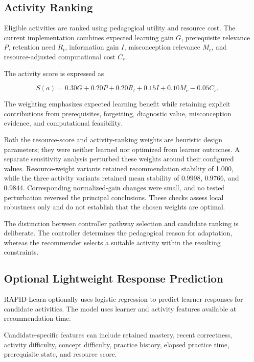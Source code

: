 \documentclass[conference]{IEEEtran}
\begin{document}
\subsection{Activity Ranking}

Eligible activities are ranked using pedagogical utility and resource cost. The current implementation combines expected learning gain $G$, prerequisite relevance $P$, retention need $R_t$, information gain $I$, misconception relevance $M_c$, and resource-adjusted computational cost $C_r$.

The activity score is expressed as

\begin{equation}
S(a)=0.30G+0.20P+0.20R_t+0.15I+0.10M_c-0.05C_r.
\end{equation}

The weighting emphasizes expected learning benefit while retaining explicit contributions from prerequisites, forgetting, diagnostic value, misconception evidence, and computational feasibility.

Both the resource-score and activity-ranking weights are heuristic design
parameters; they were neither learned nor optimized from learner outcomes. A
separate sensitivity analysis perturbed these weights around their configured
values. Resource-weight variants retained recommendation stability of 1.000,
while the three activity variants retained mean stability of 0.9998, 0.9766,
and 0.9844. Corresponding normalized-gain changes were small, and no tested
perturbation reversed the principal conclusions. These checks assess local
robustness only and do not establish that the chosen weights are optimal.

The distinction between controller pathway selection and candidate ranking is deliberate. The controller determines the pedagogical reason for adaptation, whereas the recommender selects a suitable activity within the resulting constraints.

\subsection{Optional Lightweight Response Prediction}

RAPID-Learn optionally uses logistic regression to predict learner
responses for candidate activities. The model uses learner and activity
features available at recommendation time.

Candidate-specific features can include retained mastery, recent correctness,
activity difficulty, concept difficulty, practice history, elapsed practice
time, prerequisite state, and resource score.
\end{document}
